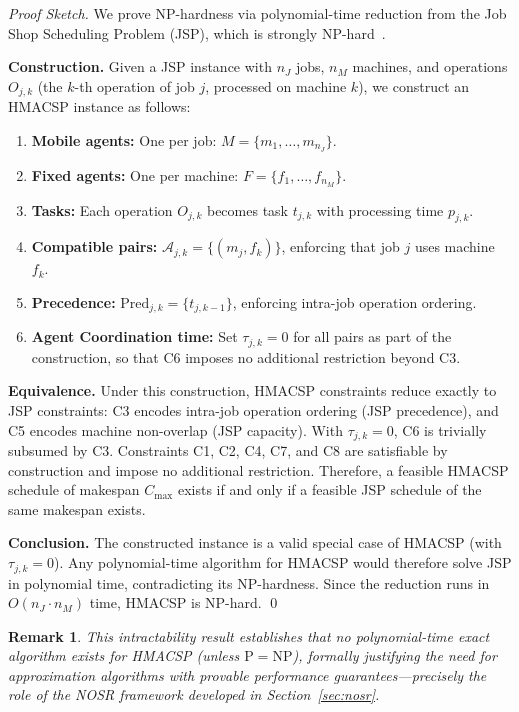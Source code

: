 \documentclass[manuscript,screen,review]{acmart}
\newtheorem{remark}{Remark}
\begin{document}
\begin{proof}[Proof Sketch]
We prove NP-hardness via polynomial-time reduction from the Job Shop
Scheduling Problem (JSP), which is strongly NP-hard~\cite{kubiak2022book}.

\textbf{Construction.} Given a JSP instance with $n_J$ jobs, $n_M$
machines, and operations $O_{j,k}$ (the $k$-th operation of job $j$,
processed on machine $k$), we construct an HMACSP instance as follows:
\begin{enumerate}[leftmargin=*, nosep]
    \item \textbf{Mobile agents:} One per job:
          $M = \{m_1, \ldots, m_{n_J}\}$.
    \item \textbf{Fixed agents:} One per machine:
          $F = \{f_1, \ldots, f_{n_M}\}$.
    \item \textbf{Tasks:} Each operation $O_{j,k}$ becomes task $t_{j,k}$
          with processing time $p_{j,k}$.
    \item \textbf{Compatible pairs:} $\mathcal{A}_{j,k} = \{(m_j, f_k)\}$,
          enforcing that job $j$ uses machine $f_k$.
    \item \textbf{Precedence:} $\mathrm{Pred}_{j,k} = \{t_{j,k-1}\}$,
          enforcing intra-job operation ordering.
    \item \textbf{Agent Coordination time:} Set $\tau_{j,k} = 0$ for all pairs
          as part of the construction, so that C6 imposes no additional
          restriction beyond C3.
\end{enumerate}

\textbf{Equivalence.} Under this construction, HMACSP constraints
reduce exactly to JSP constraints: C3 encodes intra-job operation
ordering (JSP precedence), and C5 encodes machine non-overlap (JSP
capacity). With $\tau_{j,k} = 0$, C6 is trivially subsumed by C3.
Constraints C1, C2, C4, C7, and C8 are satisfiable by construction
and impose no additional restriction. Therefore, a feasible HMACSP
schedule of makespan $C_{\max}$ exists if and only if a feasible JSP
schedule of the same makespan exists.

\textbf{Conclusion.} The constructed instance is a valid special case
of HMACSP (with $\tau_{j,k} = 0$). Any polynomial-time algorithm for
HMACSP would therefore solve JSP in polynomial time, contradicting its
NP-hardness. Since the reduction runs in $O(n_J \cdot n_M)$ time,
HMACSP is NP-hard. \qed
\end{proof}

\begin{remark}
This intractability result establishes that no polynomial-time exact
algorithm exists for HMACSP (unless $\mathrm{P} = \mathrm{NP}$),
formally justifying the need for approximation algorithms with provable
performance guarantees---precisely the role of the NOSR framework
developed in Section~\ref{sec:nosr}.
\end{remark}
\end{document}
